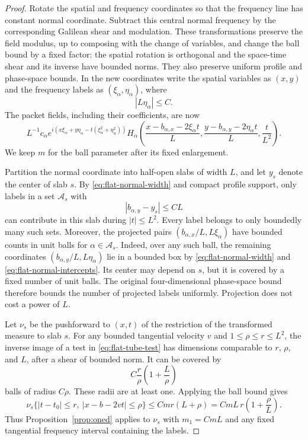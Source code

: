 \begin{proof}
Rotate the spatial and frequency coordinates so that the frequency
line has constant normal coordinate.  Subtract this central normal
frequency by the corresponding Galilean shear and modulation.
These transformations preserve the field modulus, up to composing
with the change of variables, and change the ball bound by a fixed
factor: the spatial rotation is orthogonal and the space-time shear
and its inverse have bounded norms.  They also preserve uniform
profile and phase-space bounds.  In the new coordinates write the
spatial variables as $(x,y)$ and the frequency labels as
$(\xi_\alpha,\eta_\alpha)$, where
\begin{equation}\label{eq:flat-normal-width}
 |L\eta_\alpha|\leq C.
\end{equation}
The packet fields, including their coefficients, are now
\[
 L^{-1}c_\alpha
 e^{i(x\xi_\alpha+y\eta_\alpha
                     -t(\xi_\alpha^2+\eta_\alpha^2))}
 H_\alpha\left(
       \frac{x-b_{\alpha,x}-2\xi_\alpha t}{L},
       \frac{y-b_{\alpha,y}-2\eta_\alpha t}{L},
       \frac{t}{L^2}\right).
\]
We keep $m$ for the ball parameter after its fixed enlargement.

Partition the normal coordinate into half-open slabs of width $L$,
and let $y_s$ denote the center of slab $s$.  By
\eqref{eq:flat-normal-width} and compact profile support, only labels
in a set $\mathcal A_s$ with
\begin{equation}\label{eq:flat-normal-intercepts}
 |b_{\alpha,y}-y_s|\leq C L
\end{equation}
can contribute in this slab during $|t|\leq L^2$.  Every label
belongs to only boundedly many such sets.  Moreover, the projected
pairs $(b_{\alpha,x}/L,L\xi_\alpha)$ have bounded counts in unit
balls for $\alpha\in\mathcal A_s$.  Indeed, over any such ball, the
remaining coordinates $(b_{\alpha,y}/L,L\eta_\alpha)$ lie in a
bounded box by \eqref{eq:flat-normal-width} and
\eqref{eq:flat-normal-intercepts}.  Its center may depend on $s$,
but it is covered by a fixed number of unit balls.  The original
four-dimensional phase-space bound therefore bounds the number of
projected labels uniformly.  Projection does not cost a power of $L$.

Let $\nu_s$ be the pushforward to $(x,t)$ of the restriction of the
transformed measure to slab $s$.  For any bounded tangential velocity
$v$ and $1\leq\rho\leq r\leq L^2$, the inverse image of a test in
\eqref{eq:flat-tube-test} has dimensions comparable to $r$, $\rho$,
and $L$, after a shear of bounded norm.  It can be covered by
\[
 C\frac r\rho\left(1+\frac L\rho\right)
\]
balls of radius $C\rho$.  These radii are at least one.  Applying the
ball bound gives
\begin{equation}\label{eq:flat-projected-test}
 \nu_s\{|t-t_0|\leq r,\ |x-b-2vt|\leq\rho\}
      \leq Cmr(L+\rho)
      =CmL\,r\left(1+\frac\rho L\right).
\end{equation}
Thus Proposition~\ref{prop:oned} applies to $\nu_s$ with
$m_1=CmL$ and any fixed tangential frequency interval containing
the labels.


\end{proof}
